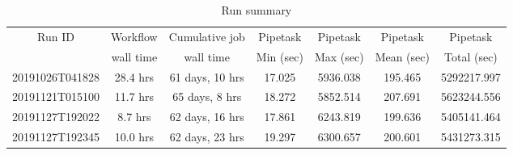\begin{table}
\centering
\begin{tabular} {|c|c|c|c|c|c|c|}
\hline
\multirow{2}{*}{Run ID} & Workflow & Cumulative job & Pipetask & Pipetask & Pipetask & Pipetask \\
                        & wall time & wall time     & Min (sec) & Max (sec) & Mean (sec) & Total (sec)\\
\hline
20191026T041828 & 28.4 hrs & 61 days, 10 hrs & 17.025 & 5936.038 & 195.465 & 5292217.997 \\
20191121T015100 & 11.7 hrs & 65 days, 8 hrs  & 18.272 & 5852.514 & 207.691 & 5623244.556 \\
20191127T192022 &  8.7 hrs & 62 days, 16 hrs & 17.861 & 6243.819 & 199.636 & 5405141.464 \\
20191127T192345 & 10.0 hrs & 62 days, 23 hrs & 19.297 & 6300.657 & 200.601 & 5431273.315 \\ \hline
\end{tabular}
\caption{Run summary}
\label{tab:runSummary}
\end{table}
